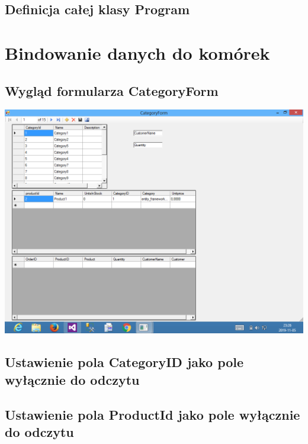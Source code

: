 \documentclass[a4paper, 11pt]{article}
\begin{document}
    \subsection{Definicja całej klasy Program}
    

    
    \section{Bindowanie danych do komórek}

    \subsection{Wygląd formularza CategoryForm}
    \begin{center}
        \includegraphics{images/CategoryForm1.png}
    \end{center}
    
    \newpage

    \subsection{Ustawienie pola CategoryID jako pole wyłącznie do odczytu}
    
    
    \subsection{Ustawienie pola ProductId jako pole wyłącznie do odczytu}
    
\end{document}
